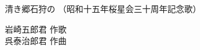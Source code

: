 \documentclass[10pt,b5j]{tarticle} %
\begin{document}
\begin{minipage}[c]{0.7\hsize} %
    \begin{center}
        {\LARGE
            清き郷石狩の %
        }
        {\small 
            （昭和十五年桜星会三十周年記念歌） %
        }
    \end{center}
\end{minipage}
\begin{minipage}[c]{0.3\hsize} %
    \begin{flushright} %
        岩崎五郎君 作歌\\呉泰治郎君 作曲 %
    \end{flushright}
\end{minipage}
\end{document}
